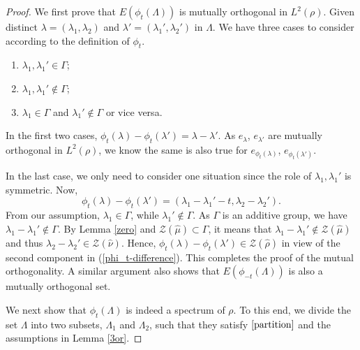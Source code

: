 \documentclass[10pt,a4paper]{amsart}
\begin{document}
\begin{proof}

We first prove that $E(\phi_t(\Lambda))$ is mutually orthogonal in $L^2(\rho)$. Given distinct $\lambda = (\lambda_1,\lambda_2)$ and $\lambda' = (\lambda_1',\lambda_2')$ in $\Lambda$. We have three cases to consider according to the definition of $\phi_t$. 
\begin{enumerate}
    \item  $\lambda_1,\lambda_1'\in\Gamma$;
    \item  $\lambda_1,\lambda_1'\not\in\Gamma$;
    \item  $\lambda_1\in\Gamma$ and $\lambda_1'\not\in \Gamma$ or vice versa. 
\end{enumerate}

In the first two cases, $\phi_t(\lambda)-\phi_t(\lambda') = \lambda-\lambda'$. As $e_{\lambda}$, $e_{\lambda'}$ are mutually orthogonal in $L^2(\rho)$, we know the same is also true for $e_{\phi_t(\lambda)}$, $e_{\phi_t(\lambda')}$.

In the last case, we only need to consider one situation since the role of $\lambda_1,\lambda_1'$ is symmetric.  Now,
\begin{equation}\label{phi_t-difference}
\phi_t(\lambda)-\phi_t(\lambda') = (\lambda_1-\lambda_1'-t,\lambda_2-\lambda_2').
\end{equation}
From our assumption, $\lambda_1\in \Gamma$, while $\lambda_1'\not\in \Gamma$. As  $\Gamma$ is an {additive} group, we have $\lambda_1-\lambda_1'\not\in\Gamma$. By Lemma \ref{zero} and ${\mathcal Z}(\widehat{\mu})\subset \Gamma$, it means that $\lambda_1-\lambda_1'\not\in{\mathcal Z}(\widehat{\mu})$ and thus $\lambda_2-\lambda_2'\in{\mathcal Z}(\widehat{\nu})$. Hence, $\phi_t(\lambda)-\phi_t(\lambda')\in {\mathcal Z}(\widehat{\rho})$ in view of the second component in (\ref{phi_t-difference}). This completes the proof of the mutual orthogonality. A similar argument also  shows that  $E(\phi_{-t}(\Lambda))$ is also a mutually orthogonal set. 


 We next show that $\phi_{t}(\Lambda)$ is indeed a spectrum of $\rho$. To this end, we  divide the set $\Lambda$ into two subsets, $\Lambda_{1}$ and $\Lambda_{2}$, such that they satisfy $\eqref{partition}$ and the assumptions in Lemma \ref{3or}.


\end{proof}
\end{document}
